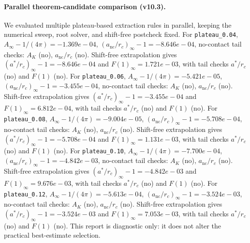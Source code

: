 \paragraph{Parallel theorem-candidate comparison (v10.3).}
We evaluated multiple plateau-based extraction rules in parallel, keeping the numerical sweep, root solver, and shift-free postcheck fixed. For \texttt{plateau_0.04}, $A_\infty-1/(4\pi)=-1.369e-04$, $(a_{\mathrm{nc}}/r_c)_\infty-1=-8.646e-04$, no-contact tail checks: $A_K$ (no), $a_{\mathrm{nc}}/r_c$ (no). Shift-free extrapolation gives $(a^*/r_c)_\infty-1=-8.646e-04$ and $F(1)_\infty=1.721e-03$, with tail checks $a^*/r_c$ (no) and $F(1)$ (no). For \texttt{plateau_0.06}, $A_\infty-1/(4\pi)=-5.421e-05$, $(a_{\mathrm{nc}}/r_c)_\infty-1=-3.455e-04$, no-contact tail checks: $A_K$ (no), $a_{\mathrm{nc}}/r_c$ (no). Shift-free extrapolation gives $(a^*/r_c)_\infty-1=-3.455e-04$ and $F(1)_\infty=6.812e-04$, with tail checks $a^*/r_c$ (no) and $F(1)$ (no). For \texttt{plateau_0.08}, $A_\infty-1/(4\pi)=-9.004e-05$, $(a_{\mathrm{nc}}/r_c)_\infty-1=-5.708e-04$, no-contact tail checks: $A_K$ (no), $a_{\mathrm{nc}}/r_c$ (no). Shift-free extrapolation gives $(a^*/r_c)_\infty-1=-5.708e-04$ and $F(1)_\infty=1.131e-03$, with tail checks $a^*/r_c$ (no) and $F(1)$ (no). For \texttt{plateau_0.10}, $A_\infty-1/(4\pi)=-7.700e-04$, $(a_{\mathrm{nc}}/r_c)_\infty-1=-4.842e-03$, no-contact tail checks: $A_K$ (no), $a_{\mathrm{nc}}/r_c$ (no). Shift-free extrapolation gives $(a^*/r_c)_\infty-1=-4.842e-03$ and $F(1)_\infty=9.676e-03$, with tail checks $a^*/r_c$ (no) and $F(1)$ (no). For \texttt{plateau_0.12}, $A_\infty-1/(4\pi)=-5.613e-04$, $(a_{\mathrm{nc}}/r_c)_\infty-1=-3.524e-03$, no-contact tail checks: $A_K$ (no), $a_{\mathrm{nc}}/r_c$ (no). Shift-free extrapolation gives $(a^*/r_c)_\infty-1=-3.524e-03$ and $F(1)_\infty=7.053e-03$, with tail checks $a^*/r_c$ (no) and $F(1)$ (no). This report is diagnostic only: it does not alter the practical best-estimate selection.
